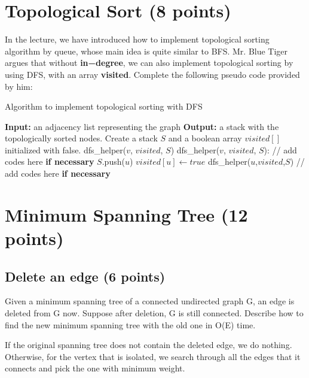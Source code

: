\documentclass[11pt]{exam}
\begin{document}
\section{Topological Sort (8 points)}
    In the lecture, we have introduced how to implement topological sorting algorithm by queue, whose main idea is quite similar to BFS. Mr. Blue Tiger argues that without \textbf{in−degree}, we can also implement topological sorting by using DFS, with an array \textbf{visited}. Complete the following pseudo code provided by him:
    \newline
    \newline
    \begin{algorithm}[htbp]
            \caption{Algorithm to implement topological sorting with DFS}
            \begin{algorithmic}[1]
                \STATE \textbf{Input:} an adjacency list representing the graph
                \STATE \textbf{Output:} a stack with the topologically sorted nodes.
                \STATE Create a stack $S$ and a boolean array $visited[]$ initialized with false.
                    \STATE dfs\_helper($v$, $visited$, $S$)
                \ENDFOR
                \newline
                \STATE dfs\_helper($v$, $visited$, $S$):
                \STATE // add codes here \textbf{if necessary}
                \newline
                \STATE $S$.push($u$)
                \STATE $visited[u]\leftarrow true$
                \STATE dfs\_helper($u$,$visited$,$S$)
                \ENDIF
                \newline
                \ENDFOR
                \STATE // add codes here \textbf{if necessary}
            \end{algorithmic}
        \end{algorithm}

\section{Minimum Spanning Tree (12 points)}
\subsection{Delete an edge (6 points)}
Given a minimum spanning tree of a connected undirected graph G, an edge is deleted from G now. Suppose after deletion, G is still connected. Describe how to find the new minimum spanning tree with the old one in O(E) time.
\begin{solution}
If the original spanning tree does not contain the deleted edge, we do nothing. Otherwise,
for the vertex that is isolated, we search through all the edges that it connects
and pick the one with minimum weight.
\end{solution}
\end{document}
